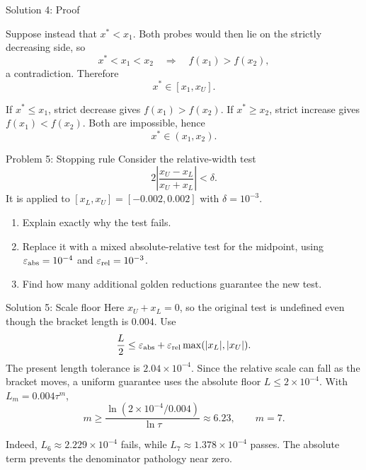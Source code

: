 \documentclass[aspectratio=169,11pt,t]{beamer}
\begin{document}
\begin{frame}{Solution 4: Proof}

  Suppose instead that \(x^*<x_1\). Both probes would then lie on the strictly
  decreasing side, so
  \[
    x^*<x_1<x_2
    \quad\Longrightarrow\quad
    f(x_1)>f(x_2),
  \]
  a contradiction. Therefore
  \[
    \boxed{x^*\in[x_1,x_U]}.
  \]


  If \(x^*\le x_1\), strict decrease gives \(f(x_1)>f(x_2)\). If
  \(x^*\ge x_2\), strict increase gives \(f(x_1)<f(x_2)\). Both are impossible,
  hence
  \[
    \boxed{x^*\in(x_1,x_2)}.
  \]

\end{frame}

\begin{frame}{Problem 5: Stopping rule}
  Consider the relative-width test
  \[
    2\left|\frac{x_U-x_L}{x_U+x_L}\right|<\delta.
  \]
  It is applied to \([x_L,x_U]=[-0.002,0.002]\) with \(\delta=10^{-3}\).

  \begin{enumerate}
    \item Explain exactly why the test fails.
    \item Replace it with a mixed absolute-relative test for the midpoint,
      using \(\varepsilon_{\rm abs}=10^{-4}\) and
      \(\varepsilon_{\rm rel}=10^{-3}\).
    \item Find how many additional golden reductions guarantee the new test.
  \end{enumerate}
\end{frame}

\begin{frame}{Solution 5: Scale floor}
  Here \(x_U+x_L=0\), so the original test is undefined even though the
  bracket length is \(0.004\). Use
  \[
    \frac{L}{2}
      \le \varepsilon_{\rm abs}
      +\varepsilon_{\rm rel}\max(|x_L|,|x_U|).
  \]
  The present length tolerance is \(2.04\times10^{-4}\). Since the relative
  scale can fall as the bracket moves, a uniform guarantee uses the absolute
  floor \(L\le2\times10^{-4}\). With \(L_m=0.004\tau^m\),
  \[
    m\ge
    \frac{\ln(2\times10^{-4}/0.004)}{\ln\tau}
    \approx6.23,
    \qquad \boxed{m=7}.
  \]

  Indeed, \(L_6\approx2.229\times10^{-4}\) fails, while
  \(L_7\approx1.378\times10^{-4}\) passes. The absolute term prevents the
  denominator pathology near zero.
\end{frame}
\end{document}
